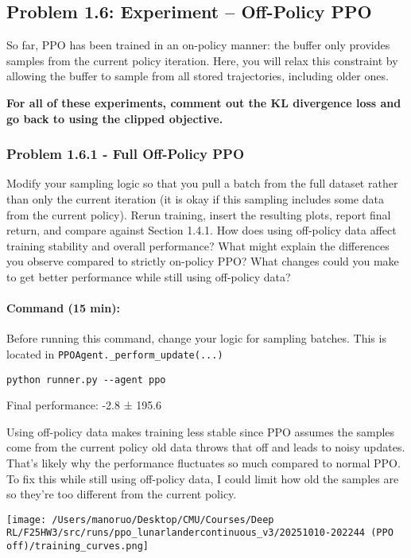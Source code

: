 \documentclass[12pt]{article}
\begin{document}
\newpage
\subsection*{Problem 1.6: Experiment – Off-Policy PPO}

So far, PPO has been trained in an on-policy manner: the buffer only provides samples from the current policy iteration. Here, you will relax this constraint by allowing the buffer to sample from all stored trajectories, including older ones.

\textbf{For all of these experiments, comment out the KL divergence loss and go back to using the clipped objective.}

\subsubsection*{Problem 1.6.1 - Full Off-Policy PPO}
Modify your sampling logic so that you pull a batch from the full dataset rather than only the current iteration (it is okay if this sampling includes some data from the current policy). Rerun training, insert the resulting plots, report final return, and compare against Section 1.4.1. How does using off-policy data affect training stability and overall performance? What might explain the differences you observe compared to strictly on-policy PPO?  What changes could you make to get better performance while still using off-policy data?

\paragraph{Command (15 min):} Before running this command, change your logic for sampling batches.  This is located in \texttt{PPOAgent.\_perform\_update(...)}
\begin{verbatim}
python runner.py --agent ppo
\end{verbatim}

\begin{solution}[height=12cm]
Final performance: -2.8 ± 195.6

Using off-policy data makes training less stable since PPO assumes the samples come from the current policy old data throws that off and leads to noisy updates.
That’s likely why the performance fluctuates so much compared to normal PPO. To fix this while still using off-policy data, I could limit how old the samples are so they're too different from the current policy.

 \centering
    \texttt{[image: /Users/manoruo/Desktop/CMU/Courses/Deep RL/F25HW3/src/runs/ppo\_lunarlandercontinuous\_v3/20251010-202244 (PPO off)/training\_curves.png]}
    \label{fig:ppo_off}

\end{solution}
\end{document}

